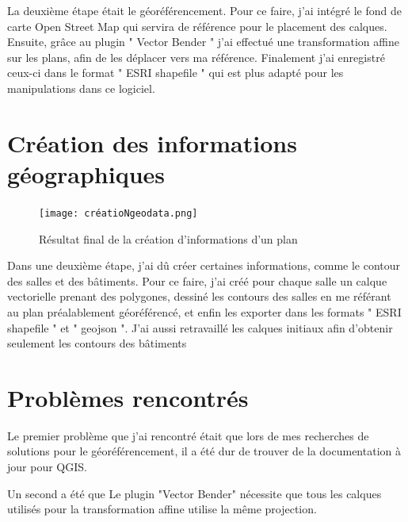 \documentclass[
    iai, %
    il, %
]{heig-tb}
\begin{document}
La deuxième étape était le géoréférencement.
Pour ce faire, j'ai intégré le fond de carte Open Street Map qui servira de référence pour le placement des calques.
Ensuite, grâce au plugin " Vector Bender " j'ai effectué une transformation affine sur les plans, afin de les déplacer vers ma référence.
Finalement j'ai enregistré ceux-ci dans le format " ESRI shapefile " qui est plus adapté pour les manipulations dans ce logiciel.

\section{Création des informations géographiques}
\begin{figure}[H]
    \caption{Résultat final de la création d'informations d'un plan}
    \centering
    \texttt{[image: créatioNgeodata.png]}
\end{figure}

Dans une deuxième étape, j'ai dû créer certaines informations, comme le contour des salles et des bâtiments.
Pour ce faire, j'ai créé pour chaque salle un calque vectorielle prenant des polygones,
dessiné les contours des salles en me référant au plan préalablement géoréférencé,
et enfin les exporter dans les formats " ESRI shapefile " et " geojson ".
J'ai aussi retravaillé les calques initiaux afin d'obtenir seulement les contours des bâtiments

\section{Problèmes rencontrés}
Le premier problème que j'ai rencontré était que lors de mes recherches de solutions pour le géoréférencement,
il a été dur de trouver de la documentation à jour pour QGIS.

Un second a été que Le plugin "Vector Bender" nécessite que tous les calques utilisés pour la transformation affine utilise la même projection.
\end{document}
